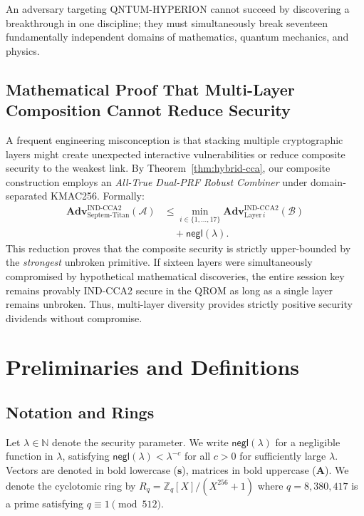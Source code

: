 \documentclass{ieeeaccess}
\newcommand{\Adv}{\mathbf{Adv}}
\newcommand{\negl}{\mathsf{negl}}
\newcommand{\Z}{\mathbb{Z}}
\newcommand{\calA}{\mathcal{A}}
\newcommand{\calB}{\mathcal{B}}
\newcommand{\bfs}{\mathbf{s}}
\newcommand{\bfA}{\mathbf{A}}
\begin{document}
An adversary targeting \textsc{QNTUM-HYPERION} cannot succeed by discovering a breakthrough in one discipline; they must simultaneously break seventeen fundamentally independent domains of mathematics, quantum mechanics, and physics.

\subsection{Mathematical Proof That Multi-Layer Composition Cannot Reduce Security}
A frequent engineering misconception is that stacking multiple cryptographic layers might create unexpected interactive vulnerabilities or reduce composite security to the weakest link. By Theorem~\ref{thm:hybrid-cca}, our composite construction employs an \emph{All-True Dual-PRF Robust Combiner} under domain-separated KMAC256. Formally:
\begin{equation}
\begin{aligned}
  \Adv_{\mathrm{Septem\text{-}Titan}}^{\mathrm{IND\text{-}CCA2}}(\calA) &\leq \min_{i \in \{1,\dots,17\}} \Adv_{\mathrm{Layer}\,i}^{\mathrm{IND\text{-}CCA2}}(\calB) \\
  &\quad + \negl(\lambda).
\end{aligned}
\end{equation}
This reduction proves that the composite security is strictly upper-bounded by the \emph{strongest} unbroken primitive. If sixteen layers were simultaneously compromised by hypothetical mathematical discoveries, the entire session key remains provably IND-CCA2 secure in the QROM as long as a single layer remains unbroken. Thus, multi-layer diversity provides strictly positive security dividends without compromise.

\section{Preliminaries and Definitions}
\label{sec:prelim}

\subsection{Notation and Rings}
Let $\lambda \in \mathbb{N}$ denote the security parameter. We write $\negl(\lambda)$ for a negligible function in $\lambda$, satisfying $\negl(\lambda) < \lambda^{-c}$ for all $c > 0$ for sufficiently large $\lambda$. Vectors are denoted in bold lowercase ($\bfs$), matrices in bold uppercase ($\bfA$). We denote the cyclotomic ring by $R_q = \Z_q[X]/(X^{256} + 1)$ where $q = 8{,}380{,}417$ is a prime satisfying $q \equiv 1 \pmod{512}$.
\end{document}
